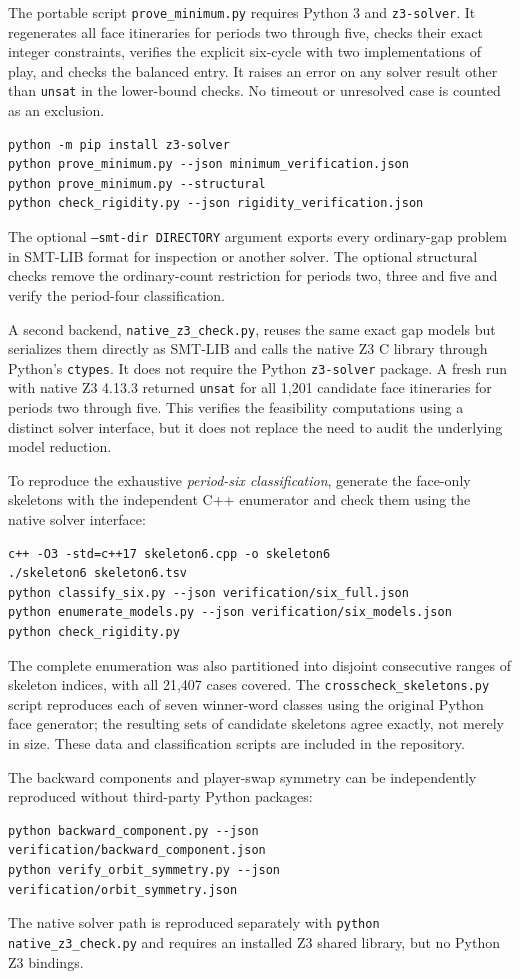 \documentclass[11pt]{article}
\newcommand{\word}[1]{\texttt{#1}}
\begin{document}
The portable script \word{prove\_minimum.py} requires Python 3 and
\word{z3-solver}. It regenerates all face itineraries for periods two
through five, checks their exact integer constraints, verifies the explicit
six-cycle with two implementations of play, and checks the balanced entry.
It raises an error on any solver result other than \word{unsat} in the
lower-bound checks. No timeout or unresolved case is counted as an exclusion.
\begin{verbatim}
python -m pip install z3-solver
python prove_minimum.py --json minimum_verification.json
python prove_minimum.py --structural
python check_rigidity.py --json rigidity_verification.json
\end{verbatim}
The optional \word{--smt-dir DIRECTORY} argument exports every ordinary-gap
problem in SMT-LIB format for inspection or another solver. The optional
structural checks remove the ordinary-count restriction for periods two,
three and five and verify the period-four classification.

A second backend, \word{native\_z3\_check.py}, reuses the same exact gap
models but serializes them directly as SMT-LIB and calls the native Z3 C
library through Python's \word{ctypes}. It does not require the Python
\word{z3-solver} package. A fresh run with native Z3 4.13.3 returned
\word{unsat} for all 1,201 candidate face itineraries for periods two
through five. This verifies the feasibility computations using a distinct
solver interface, but it does not replace the need to audit the underlying
model reduction.

To reproduce the exhaustive \emph{period-six classification}, generate
the face-only skeletons with the independent C++ enumerator and check them
using the native solver interface:
\begin{verbatim}
c++ -O3 -std=c++17 skeleton6.cpp -o skeleton6
./skeleton6 skeleton6.tsv
python classify_six.py --json verification/six_full.json
python enumerate_models.py --json verification/six_models.json
python check_rigidity.py
\end{verbatim}
The complete enumeration was also partitioned into disjoint consecutive
ranges of skeleton indices, with all 21,407 cases covered. The
\word{crosscheck\_skeletons.py} script reproduces each of seven winner-word
classes using the original Python face generator; the resulting sets of
candidate skeletons agree exactly, not merely in size. These data and
classification scripts are included in the repository.

The backward components and player-swap symmetry can be independently
reproduced without third-party Python packages:
\begin{verbatim}
python backward_component.py --json verification/backward_component.json
python verify_orbit_symmetry.py --json verification/orbit_symmetry.json
\end{verbatim}
The native solver path is reproduced separately with
\word{python native\_z3\_check.py} and requires an installed Z3 shared
library, but no Python Z3 bindings.
\end{document}
